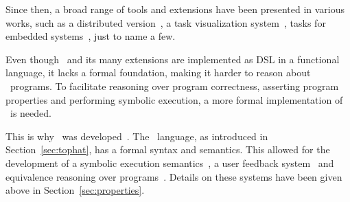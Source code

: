Since then, a broad range of tools and extensions have been presented in various works, such as a distributed version~\cite{conf/ifl/OortgieseGAP17}, a task visualization system~\cite{conf/sfp/StutterheimPA14,conf/cefp/StutterheimAP15}, tasks for embedded systems~\cite{conf/cgo/KoopmanLP18,conf/ifl/LubbersKP18,conf/mipro/LubbersKP19,conf/ifl/LubbersKP19}, just to name a few.

Even though \ITASKS\ and its many extensions are implemented as DSL in a functional language, it lacks a formal foundation, making it harder to reason about \TOP\ programs.
To facilitate reasoning over program correctness, asserting program properties and performing symbolic execution, a more formal implementation of \TOP\ is needed.

This is why \TOPHAT\ was developed~\cite{conf/ppdp/SteenvoordenNK19}.
The \TOPHAT\ language, as introduced in Section~\ref{sec:tophat}, has a formal syntax and semantics.
This allowed for the development of a symbolic execution semantics~\cite{conf/ifl/NausSK19}, a user feedback system~\cite{conf/sfp/NausS20} and equivalence reasoning over programs~\cite{conf/sfp/KlijnsmaS22}.
Details on these systems have been given above in Section~\ref{sec:properties}.